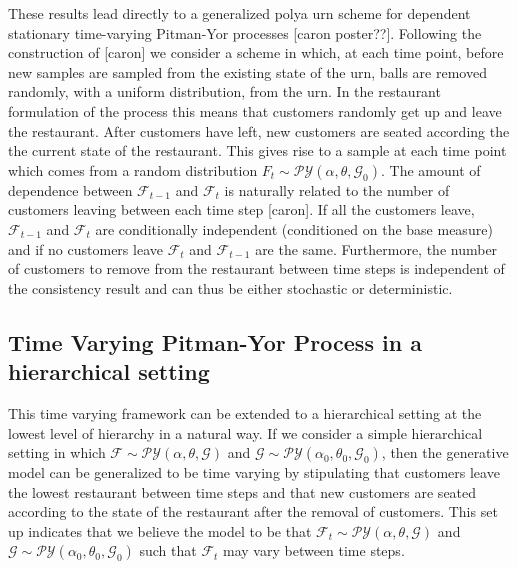 \documentclass{article}
\newcommand{\F}{\mathcal{F}}
\newcommand{\PY}{\mathcal{P}\mathcal{Y}}
\newcommand{\G}{\mathcal{G}}
\begin{document}
These results lead directly to a generalized polya urn scheme for dependent stationary time-varying Pitman-Yor processes [caron poster??].  Following the construction of [caron] we consider a scheme in which, at each time point, before new samples are sampled from the existing state of the urn, balls are removed randomly, with a uniform distribution, from the urn.  In the restaurant formulation of the process this means that customers randomly get up and leave the restaurant.  After customers have left, new customers are seated according the the current state of the restaurant.  This gives rise to a sample at each time point which comes from a random distribution $F_t \sim \PY(\alpha, \theta,\G_0)$.  The amount of dependence between $\F_{t-1}$ and $\F_t$ is naturally related to the number of customers leaving between each time step [caron].  If all the customers leave, $\F_{t-1}$ and $\F_t$ are conditionally independent (conditioned on the base measure) and if no customers leave $\F_t$ and $\F_{t-1}$ are the same.  Furthermore, the number of customers to remove from the restaurant between time steps is independent of the consistency result and can thus be either stochastic or deterministic.

\subsection{Time Varying Pitman-Yor Process in a hierarchical setting}

This time varying framework can be extended to a hierarchical setting at the lowest level of hierarchy in a natural way.  If we consider a simple hierarchical setting in which $\F \sim \PY(\alpha, \theta, \G)$ and $\G \sim \PY(\alpha_0, \theta_0, \G_0)$, then the generative model can be generalized to be time varying by stipulating that customers leave the lowest restaurant between time steps and that new customers are seated according to the state of the restaurant after the removal of customers.  This set up indicates that we believe the model to be that $\F_t \sim \PY(\alpha, \theta, \G)$ and $\G \sim \PY(\alpha_0, \theta_0, \G_0)$ such that $\F_t$ may vary between time steps.
\end{document}
